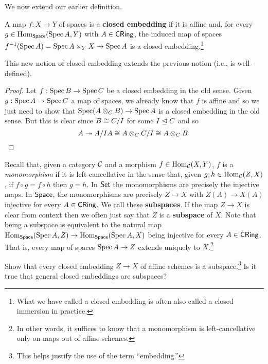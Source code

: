 \documentclass[11pt]{article}
\begin{document}
We now extend our earlier definition.

\begin{definition}
A map $f: X\to Y$ of spaces is a \textbf{closed embedding} if it is affine and, for every $g\in\operatorname{Hom}_{\operatorname{\mathsf{Space}}}(\operatorname{Spec} A,Y)$ with $A\in\operatorname{\mathsf{CRing}}$, the induced map of spaces $f^{-1}(\operatorname{Spec} A)=\operatorname{Spec} A\times_YX\to\operatorname{Spec} A$ is a closed embedding.\footnote{What we have called a closed embedding is often also called a closed immersion in practice.}
\end{definition}

\begin{proposition}
This new notion of closed embedding extends the previous notion (i.e., is well-defined).
\end{proposition}

\begin{proof}
Let $f: \operatorname{Spec} B\to\operatorname{Spec} C$ be a closed embedding in the old sense. Given $g: \operatorname{Spec} A\to\operatorname{Spec} C$ a map of spaces, we already know that $f$ is affine and so we just need to show that $\operatorname{Spec}(A\otimes_CB)\to\operatorname{Spec} A$ is a closed embedding in the old sense. But this is clear since $B\cong C/I$ for some $I\trianglelefteq C$ and so 
$$A\twoheadrightarrow A/IA\cong A\otimes_CC/I\cong A\otimes_CB.$$
\end{proof}

\begin{remark}
Recall that, given a category $\mathcal{C}$ and a morphism $f\in\operatorname{Hom}_{\mathcal{C}}(X,Y)$, $f$ is a \emph{monomorphism} if it is left-cancellative in the sense that, given $g,h\in\operatorname{Hom}_{\mathcal{C}}(Z,X)$, if $f\circ g=f\circ h$ then $g=h$. In $\operatorname{\mathsf{Set}}$ the monomorphisms are precisely the injective maps. In $\operatorname{\mathsf{Space}}$, the monomorphisms are precisely $Z\to X$ with $Z(A)\to X(A)$ injective for every $A\in\operatorname{\mathsf{CRing}}$. We call these \textbf{subspaces}. If the map $Z\to X$ is clear from context then we often just say that $Z$ is a \textbf{subspace} of $X$. Note that being a subspace is equivalent to the natural map $\operatorname{Hom}_{\operatorname{\mathsf{Space}}}(\operatorname{Spec} A,Z)\to\operatorname{Hom}_{\operatorname{\mathsf{Space}}}(\operatorname{Spec} A,X)$ being injective for every $A\in\operatorname{\mathsf{CRing}}$. That is, every map of spaces $\operatorname{Spec} A\to Z$ extends uniquely to $X$.\footnote{In other words, it suffices to know that a monomorphism is left-cancellative only on maps out of affine schemes.}
\end{remark}

\begin{proposition}
Show that every closed embedding $Z\to X$ of affine schemes is a subspace.\footnote{This helps justify the use of the term ``embedding.''} Is it true that general closed embeddings are subspaces?
\end{proposition}
\end{document}
